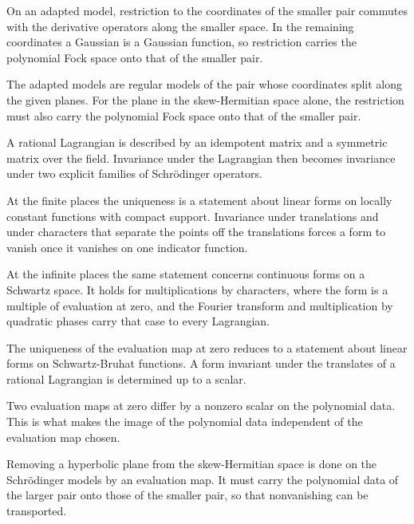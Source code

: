 On an adapted model, restriction to the coordinates of the smaller pair commutes
with the derivative operators along the smaller space. In the remaining
coordinates a Gaussian is a Gaussian function, so restriction carries the
polynomial Fock space onto that of the smaller pair.

The adapted models are regular models of the pair whose coordinates split along
the given planes. For the plane in the skew-Hermitian space alone, the
restriction must also carry the polynomial Fock space onto that of the smaller
pair.

A rational Lagrangian is described by an idempotent matrix and a symmetric
matrix over the field. Invariance under the Lagrangian then becomes invariance
under two explicit families of Schrödinger operators.

At the finite places the uniqueness is a statement about linear forms on
locally constant functions with compact support. Invariance under translations
and under characters that separate the points off the translations forces a
form to vanish once it vanishes on one indicator function.

At the infinite places the same statement concerns continuous forms on a
Schwartz space. It holds for multiplications by characters, where the form is a
multiple of evaluation at zero, and the Fourier transform and multiplication by
quadratic phases carry that case to every Lagrangian.

The uniqueness of the evaluation map at zero reduces to a statement about
linear forms on Schwartz-Bruhat functions. A form invariant under the
translates of a rational Lagrangian is determined up to a scalar.

Two evaluation maps at zero differ by a nonzero scalar on the polynomial data.
This is what makes the image of the polynomial data independent of the
evaluation map chosen.

Removing a hyperbolic plane from the skew-Hermitian space is done on the
Schrödinger models by an evaluation map. It must carry the polynomial data of
the larger pair onto those of the smaller pair, so that nonvanishing can be
transported.

